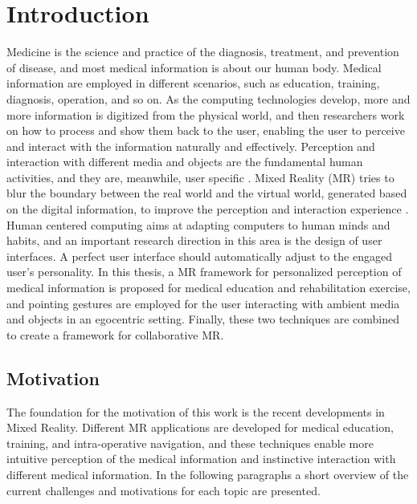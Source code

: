 %
\chapter{Introduction}  %
\label{sec:introduction}
Medicine is the science and practice of the diagnosis, treatment, and prevention of disease, and most medical information is about our human body. Medical information are employed in different scenarios, such as education, training, diagnosis, operation, and so on. 
As the computing technologies develop, more and more information is digitized from the physical world, and then researchers work on how to process and show them back to the user, enabling the user to perceive and interact with the information naturally and effectively. 
Perception and interaction with different media and objects are the fundamental human activities, and they are, meanwhile, user specific \cite{Turk2000}.
Mixed Reality (MR) tries to blur the boundary between the real world and the virtual world, generated based on the digital information, to improve the perception and interaction experience \cite{Kruijff2010}.
Human centered computing aims at adapting computers to human minds and habits, and an important research direction in this area is the design of user interfaces. 
A perfect user interface should automatically adjust to the engaged user's personality. 
In this thesis, a MR framework for personalized perception of medical information is proposed for medical education and rehabilitation exercise, and pointing gestures are employed for the user interacting with ambient media and objects in an egocentric setting. Finally, these two techniques are combined to create a framework for collaborative MR.

\section{Motivation}
The foundation for the motivation of this work is the recent developments in Mixed Reality. Different MR applications are developed for medical education, training, and intra-operative navigation, and these techniques enable more intuitive perception of the medical information and instinctive interaction with different medical information. 
In the following paragraphs a short overview of the current challenges and motivations for each topic are presented. 

